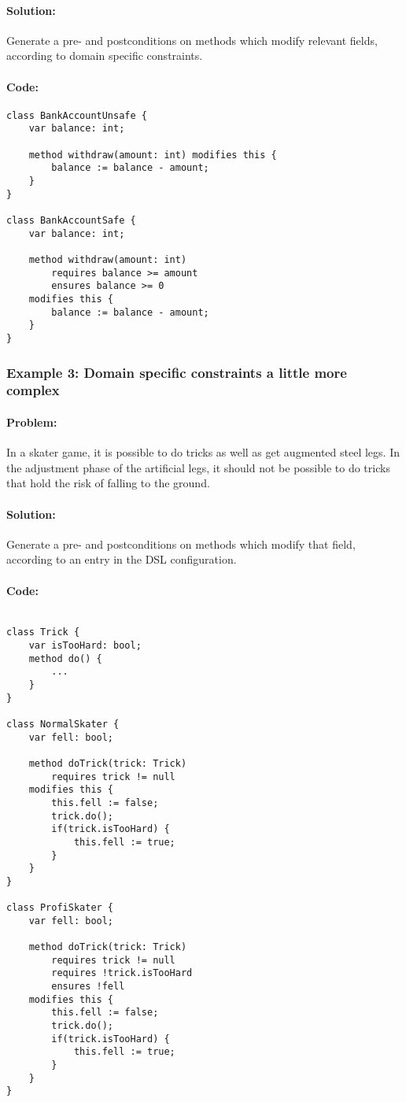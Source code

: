 \paragraph{Solution:}
Generate a pre- and postconditions on methods which modify relevant fields, according to domain specific constraints.

\paragraph{Code:}
\lstset{style=dafny}
\begin{lstlisting}
class BankAccountUnsafe {
	var balance: int;
	
	method withdraw(amount: int) modifies this {
		balance := balance - amount;
	}
}

class BankAccountSafe {
	var balance: int;
	
	method withdraw(amount: int) 
		requires balance >= amount  
		ensures balance >= 0  
	modifies this {
		balance := balance - amount;
	}
}
\end{lstlisting}


\subsubsection{Example 3: Domain specific constraints a little more complex} \label{Example 3}
\paragraph{Problem:}
In a skater game, it is possible to do tricks as well as get augmented steel legs. In the adjustment phase of the artificial legs, it should not be possible to do tricks that hold the risk of falling to the ground.
\paragraph{Solution:}
Generate a pre- and postconditions on methods which modify that field, according to an entry in the DSL configuration.

\paragraph{Code:}
\lstset{style=dafny}
\begin{lstlisting}

class Trick {
	var isTooHard: bool;
	method do() {
		...
	}
}

class NormalSkater {
	var fell: bool;
	
	method doTrick(trick: Trick) 
		requires trick != null
	modifies this {
		this.fell := false;
		trick.do();
		if(trick.isTooHard) {
			this.fell := true;
		}
	}
}

class ProfiSkater {
	var fell: bool;
	
	method doTrick(trick: Trick) 
		requires trick != null
		requires !trick.isTooHard
		ensures !fell
	modifies this {
		this.fell := false;
		trick.do();
		if(trick.isTooHard) {
			this.fell := true;
		}
	}
}

\end{lstlisting}


